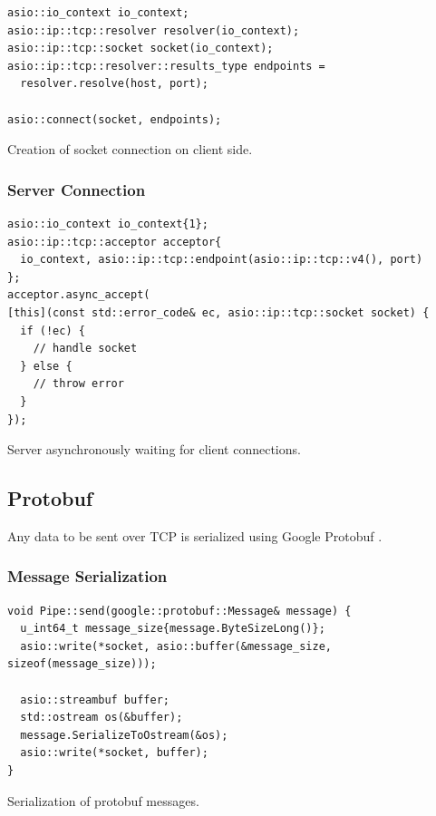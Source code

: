 \documentclass[12pt, letterpaper]{article}
\newenvironment{code}{\captionsetup{type=listing}}{}
\begin{document}
\begin{code}
	\begin{verbatim}
asio::io_context io_context;
asio::ip::tcp::resolver resolver(io_context);
asio::ip::tcp::socket socket(io_context);
asio::ip::tcp::resolver::results_type endpoints = 
  resolver.resolve(host, port);

asio::connect(socket, endpoints);

	\end{verbatim}
	\caption{Creation of socket connection on client side.}
	\label{clientConnection}
\end{code}


\subsubsection{Server Connection}

\begin{code}
	\begin{verbatim}
asio::io_context io_context{1};
asio::ip::tcp::acceptor acceptor{
  io_context, asio::ip::tcp::endpoint(asio::ip::tcp::v4(), port)
};
acceptor.async_accept(
[this](const std::error_code& ec, asio::ip::tcp::socket socket) {
  if (!ec) {
    // handle socket
  } else {
    // throw error
  }
});
	\end{verbatim}
	\caption{Server asynchronously waiting for client connections.}
	\label{serverConnection}
\end{code}

\subsection{Protobuf}
Any data to be sent over TCP is serialized using Google Protobuf \cite{protobuf}.
\newline

\subsubsection{Message Serialization}
\begin{code}
	\begin{verbatim}
void Pipe::send(google::protobuf::Message& message) {
  u_int64_t message_size{message.ByteSizeLong()};
  asio::write(*socket, asio::buffer(&message_size, sizeof(message_size)));
	
  asio::streambuf buffer;
  std::ostream os(&buffer);
  message.SerializeToOstream(&os);
  asio::write(*socket, buffer);
}
	\end{verbatim}
	\caption{Serialization of protobuf messages.}
	\label{pipeSend}
\end{code}
\end{document}
